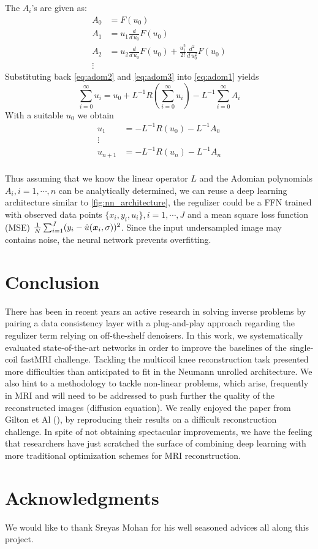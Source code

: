 \documentclass{article}
\begin{document}
The $A_i$'s are given as:
\begin{align*}
	A_0	&=	F(u_0) \\
	A_1	&=	u_1 \frac{d}{d \, u_0} F(u_0) \\
	A_2	&=	u_2 \frac{d}{d \, u_0} F(u_0) + \frac{u_1^2}{2!}  \frac{d^2}{d \, u_0^2} F(u_0)  \\
	\vdots
\end{align*}
Substituting back \eqref{eq:adom2} and \eqref{eq:adom3} into \eqref{eq:adom1} yields
\begin{equation}
	 \sum_{i=0}^\infty u_i  =  u_0  + L^{-1} R( \sum_{i=0}^\infty u_i) -   L^{-1}    \sum_{i=0}^\infty  A_i \label{eq:adom4}
\end{equation}	
With a suitable $u_0$ we obtain
\begin{align*}
	u_1 			&=	-L^{-1} R(u_0) - L^{-1} A_0 \\
	\vdots \\
	u_{n+1} 		&=  -L^{-1} R(u_n) - L^{-1} A_n \\
\end{align*}

Thus assuming that we know the linear operator $L$ and  the Adomian polynomials $A_i, i=1,\cdots,n$ can be analytically determined, we can reuse a deep learning architecture similar to \ref{fig:nn_architecture}, the regulizer could be a FFN trained with observed data points $\{x_i, y_i, u_i\}, i=1,\cdots,J$ and a mean square loss function (MSE) $\frac{1}{N} \sum_{i=1}^J (y_i - \hat{u}(\bm{x}_i, \sigma))^2$. Since the input undersampled image may contains noise, the neural network prevents overfitting.

\section{Conclusion}
There has been in recent years an active research in solving inverse problems by pairing a data consistency layer with a plug-and-play approach regarding the regulizer term relying on off-the-shelf denoisers. In this work, we systematically evaluated state-of-the-art networks in order to improve the baselines of the single-coil fastMRI challenge. Tackling the multicoil knee reconstruction task presented more difficulties than anticipated to fit in the Neumann unrolled architecture. We also hint to a methodology to tackle non-linear problems, which arise, frequently in MRI and will need to be addressed  to push further the quality of the reconstructed images (diffusion equation). We really enjoyed the paper from Gilton et Al (\cite{DBLP:journals/corr/abs-1901-03707}), by reproducing their results on a difficult reconstruction challenge. In spite of not obtaining spectacular improvements, we have the feeling that researchers have just scratched the surface of combining deep learning with more traditional optimization schemes for MRI reconstruction. 

\section{Acknowledgments}
We would like to thank Sreyas Mohan for his well seasoned advices all along this project.

\nocite{*}


\end{document}
